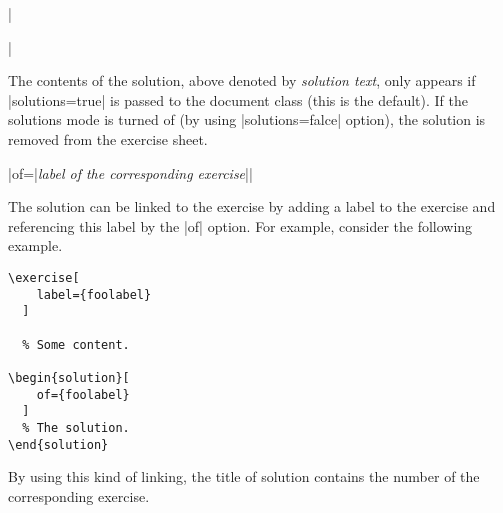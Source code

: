 \documentclass[a4paper,fleqn]{report}
\def\syntaxdefaultarg#1{\hfill\texttt{\small #1}\par\smallskip\noindent\ignorespaces}
\def\metaargument#1{\textit{\small #1}}
\begin{document}
\begin{syntax}
  ||
  \syntaxdefaultarg{}
  The contents of the solution, above denoted by
  \metaargument{solution text}, only appears if |solutions=true| is
  passed to the document class (this is the default). If the solutions
  mode is turned of (by using |solutions=falce| option), the solution
  is removed from the exercise sheet.

  \begin{syntax}
    |of={|\metaargument{label of the corresponding exercise}|}| 
    \syntaxdefaultarg{}
    The solution can be linked to the exercise by adding a label to
    the exercise and referencing this label by the |of| option. For
    example, consider the following example.
    \begin{lstlisting}
\exercise[
    label={foolabel}
  ]

  % Some content.

\begin{solution}[
    of={foolabel}
  ]
  % The solution.
\end{solution}

    \end{lstlisting}
    \noindent By using this kind of linking, the title of solution
    contains the number of the corresponding exercise.
  \end{syntax}
\end{syntax}
\end{document}
